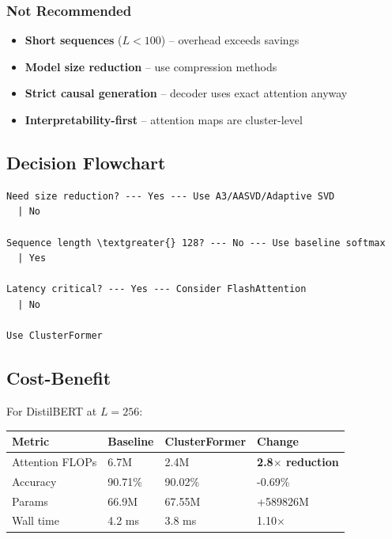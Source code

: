 \subsubsection{Not Recommended}

\begin{itemize}
\item \textbf{Short sequences} ($L < 100$) -- overhead exceeds savings
\item \textbf{Model size reduction} -- use compression methods
\item \textbf{Strict causal generation} -- decoder uses exact attention anyway
\item \textbf{Interpretability-first} -- attention maps are cluster-level

\end{itemize}
\subsection{Decision Flowchart}

\begin{lstlisting}
Need size reduction? --- Yes --- Use A3/AASVD/Adaptive SVD
  | No
   
Sequence length \textgreater{} 128? --- No --- Use baseline softmax
  | Yes
   
Latency critical? --- Yes --- Consider FlashAttention
  | No
   
Use ClusterFormer
\end{lstlisting}

\subsection{Cost-Benefit}

For DistilBERT at $L=256$:

\begin{table}[H]
\centering
\small
\begin{tabular}{llll}
\toprule
\textbf{Metric} & \textbf{Baseline} & \textbf{ClusterFormer} & \textbf{Change} \\
\midrule
Attention FLOPs & 6.7M & 2.4M & \textbf{2.8$\times$ reduction} \\
Accuracy & 90.71\% & 90.02\% & -0.69\% \\
Params & 66.9M & 67.55M & +589826M \\
Wall time & 4.2 ms & 3.8 ms & 1.10$\times$ \\
\bottomrule
\end{tabular}
\end{table}

